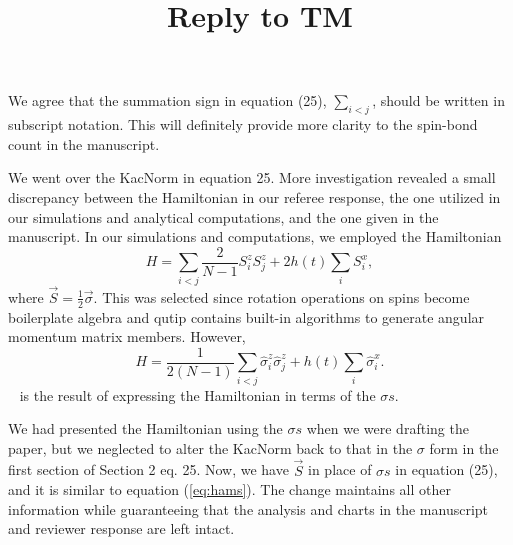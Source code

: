 \documentclass[10pt]{article}
\title{Reply to TM}
\begin{document}
\maketitle
We agree that the summation sign in equation (25), $\sum_{i<j}$, should be written in subscript notation. This will definitely provide more clarity to the spin-bond count in the manuscript.

We went over the KacNorm in equation 25. More investigation revealed a small discrepancy between the Hamiltonian in our referee response, the one utilized in our simulations and analytical computations, and the one given in the manuscript. In our simulations and computations, we employed the Hamiltonian 
\begin{equation}
	H = \sum_{i<j} \frac{2}{N-1} S^z_i S^z_j + 2h(t) \sum_i S^x_i, \label{eq:hams} 
\end{equation}
where $\vec{S}=\frac12\vec{\sigma}$. This was selected since rotation operations on spins become boilerplate algebra and qutip contains built-in algorithms to generate angular momentum matrix members. However, 
\begin{equation} 
	H = \frac{1}{2(N-1)} \sum_{i<j} \hat{\sigma}^z_i \hat{\sigma}^z_j + h(t) \sum_i \hat{\sigma}^x_i. \label{eq:hamh} 
\end{equation} 
is the result of expressing the Hamiltonian in terms of the $\sigma s$.

We had presented the Hamiltonian using the $\sigma s$ when we were drafting the paper, but we neglected to alter the KacNorm back to that in the $\sigma$ form in the first section of Section 2 eq. 25. Now, we have $\vec{S}$ in place of $\sigma s$ in equation (25), and it is similar to equation (\eqref{eq:hams}). The change maintains all other information while guaranteeing that the analysis and charts in the manuscript and reviewer response are left intact.
\end{document}
